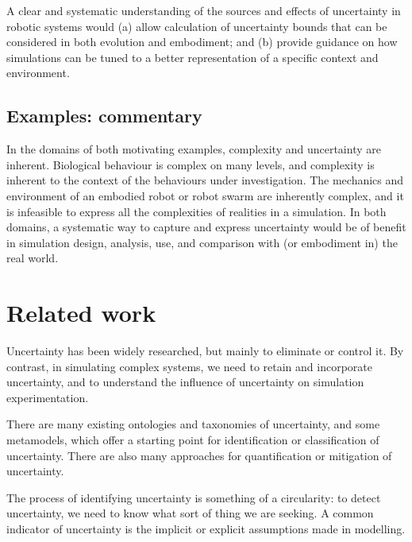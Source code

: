\documentclass[sigconf,authordraft]{acmart}
\begin{document}
A clear and systematic understanding of the sources and effects of uncertainty in robotic systems would (a) allow calculation of uncertainty bounds that can be considered in both evolution and embodiment; and (b) provide guidance on how simulations can be tuned to a better representation of a specific context and environment.



\subsection{Examples: commentary}

In the domains of both motivating examples, complexity and uncertainty are inherent.  Biological behaviour is complex on many levels, and complexity is inherent to the context of the behaviours under investigation.  The mechanics and environment of an embodied robot or robot swarm are inherently complex, and it is infeasible to express all the complexities of realities in a simulation.  In both domains, a systematic way to capture and express uncertainty would be of benefit in simulation design, analysis, use, and comparison with (or embodiment in) the real world.  

\section{Related work}\label{sec:related}

Uncertainty has been widely researched, but mainly to eliminate or control it.  By contrast, in simulating complex systems, we need to retain and incorporate uncertainty, and to understand the influence of uncertainty on simulation experimentation. 

There are many existing ontologies and taxonomies of uncertainty, and some metamodels, which offer a starting point for identification or classification of uncertainty.  There are also many approaches for quantification or mitigation of uncertainty.  %

The process of identifying uncertainty is something of a circularity: to detect uncertainty, we need to know what sort of thing we are seeking.  A common indicator of uncertainty is the implicit or explicit assumptions made in modelling.  
\end{document}
